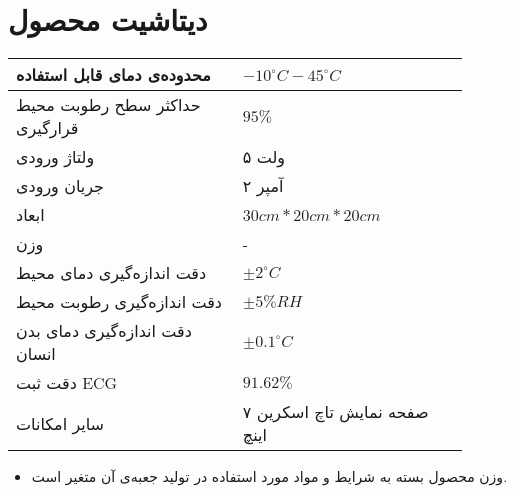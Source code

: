 \chapter{دیتاشیت محصول}



\begin{table}[ht!]
	\begin{tabular}{|p{0.45\linewidth}|p{0.45\linewidth}|}
		\hline		
				محدوده‌ی دمای قابل استفاده
		&    $-10 ^\circ C - 45 ^\circ C$
		\\ \hline
		حداکثر سطح رطوبت محیط قرارگیری 
		&   
		$		95\%$		
		\\ \hline
		ولتاژ ورودی
		&   
	۵ ولت	
		\\ \hline
		جریان ورودی
		&   
۲ آمپر
		\\ \hline
		ابعاد
		&   
$30cm * 20cm * 20cm$
		\\ \hline
		وزن
		&   
- 
		\\ \hline
		دقت اندازه‌گیری دمای محیط     &
		$\pm2 ^\circ C$
		 \\ \hline
		دقت اندازه‌گیری رطوبت محیط &   
				$\pm5\%RH$
		 \\ \hline
		 دقت اندازه‌گیری دمای بدن انسان
&
$ \pm 0.1 ^\circ C$
		 \\ \hline	 
		 دقت ثبت ECG
		 &
$		 91.62\% $
		 		 \\ \hline	 
		 
سایر امکانات
		 &
صفحه نمایش تاچ اسکرین ۷ اینچ
		 \\ \hline
	\end{tabular}
\end{table}

\begin{itemize}
	\item 
وزن محصول بسته به شرایط و مواد مورد استفاده در تولید جعبه‌ی آن متغیر است.

\end{itemize}